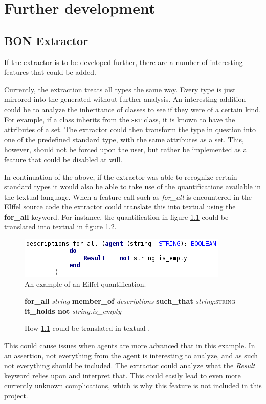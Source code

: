 \chapter{Further development}
\section{BON Extractor}
If the \bon{} extractor is to be developed further, there are a number of interesting features that could be added. 

Currently, the \bon{} extraction treats all types the same way. Every type is just mirrored into the generated \bon{} without further analysis. An interesting addition could be to analyze the inheritance of classes to see if they were of a certain kind. For example, if a class inherits from the \textsc{set} class, it is known to have the attributes of a set. The extractor could then transform the type in question into one of the predefined standard type, with the same attributes as a set. This, however, should not be forced upon the user, but rather be implemented as a feature that could be disabled at will.

In continuation of the above, if the extractor was able to recognize certain standard types it would also be able to take use of the quantifications available in the textual \bon{} language. When a feature call such as \textit{for\_all} is encountered in the EIffel source code the extractor could translate this into textual \bon{} using the \textbf{for\_all} keyword. For instance, the quantification in figure \ref{fig:agent-for-all} could be translated into textual \bon{} in figure \ref{fig:bon-for-all}.
\begin{figure}[h]
\centerline{
\includegraphics[scale=0.7]{images/agent_example.png} 
}
\caption{An example of an Eiffel quantification.}
\label{fig:agent-for-all}
\end{figure}

\begin{figure}[h]
\centerline{
\footnotesize{\textbf{for\_all} \textit{string} \textbf{member\_of} \textit{descriptions} \textbf{such\_that} \textit{string}:\textsc{string} \textbf{it\_holds not} \textit{string.is\_empty}}
}
\caption{How \ref{fig:agent-for-all} could be translated in textual \bon.}
\label{fig:bon-for-all}
\end{figure}
This could cause issues when agents are more advanced that in this example. In an assertion, not everything from the agent is interesting to analyze, and as such not everything should be included. The extractor could analyze what the \textit{Result} keyword relies upon and interpret that. This could easily lead to even more currently unknown complications, which is why this feature is not included in this project.

